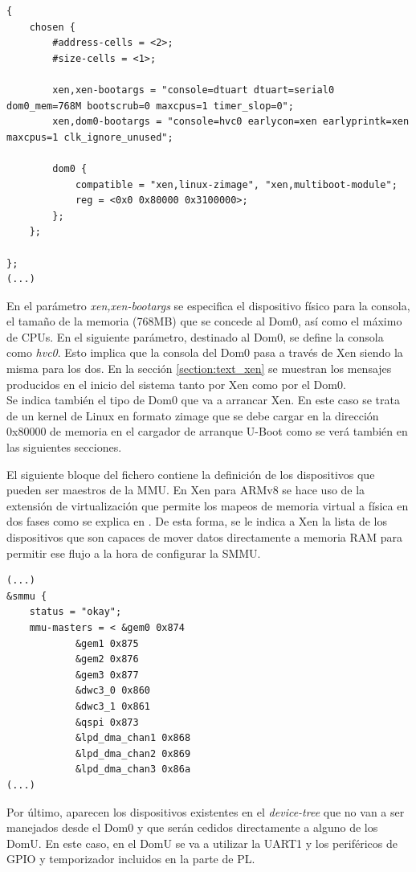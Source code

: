 \begin{lstlisting}[style=CStyle]
{
	chosen {
		#address-cells = <2>;
		#size-cells = <1>;

		xen,xen-bootargs = "console=dtuart dtuart=serial0 dom0_mem=768M bootscrub=0 maxcpus=1 timer_slop=0";
		xen,dom0-bootargs = "console=hvc0 earlycon=xen earlyprintk=xen maxcpus=1 clk_ignore_unused";

		dom0 {
			compatible = "xen,linux-zimage", "xen,multiboot-module";
			reg = <0x0 0x80000 0x3100000>;
		};
	};

};
(...)
\end{lstlisting}

En el parámetro \textit{xen,xen-bootargs} se especifica el dispositivo físico para la consola, el tamaño de la memoria (768MB) que se concede al Dom0, así como el máximo de CPUs. En el siguiente parámetro, destinado al Dom0, se define la consola como \textit{hvc0}. Esto implica que la consola del Dom0 pasa a través de Xen siendo la misma para los dos. En la sección \ref{section:text_xen} se muestran los mensajes producidos en el inicio del sistema tanto por Xen como por el Dom0.\\
Se indica también el tipo de Dom0 que va a arrancar Xen. En este caso se trata de un kernel de Linux en formato zimage que se debe cargar en la dirección 0x80000 de memoria en el cargador de arranque U-Boot como se verá también en las siguientes secciones.

El siguiente bloque del fichero contiene la definición de los dispositivos que pueden ser maestros de la MMU. En Xen para ARMv8 se hace uso de la extensión de virtualización que permite los mapeos de memoria virtual a física en dos fases como se explica en \cite{armv8_stage2}. De esta forma, se le indica a Xen la lista de los dispositivos que son capaces de mover datos directamente a memoria \acrshort{RAM} para permitir ese flujo a la hora de configurar la \acrshort{SMMU}.

\begin{lstlisting}[style=CStyle]
(...)
&smmu {
	status = "okay";
	mmu-masters = < &gem0 0x874
			&gem1 0x875
			&gem2 0x876
			&gem3 0x877
			&dwc3_0 0x860
			&dwc3_1 0x861
			&qspi 0x873
			&lpd_dma_chan1 0x868
			&lpd_dma_chan2 0x869
			&lpd_dma_chan3 0x86a
(...)
\end{lstlisting}

Por último, aparecen los dispositivos existentes en el \textit{device-tree} que no van a ser manejados desde el Dom0 y que serán cedidos directamente a alguno de los DomU. En este caso, en el DomU se va a utilizar la \acrshort{UART}1 y los periféricos de \acrshort{GPIO} y temporizador incluidos en la parte de \acrshort{PL}.

